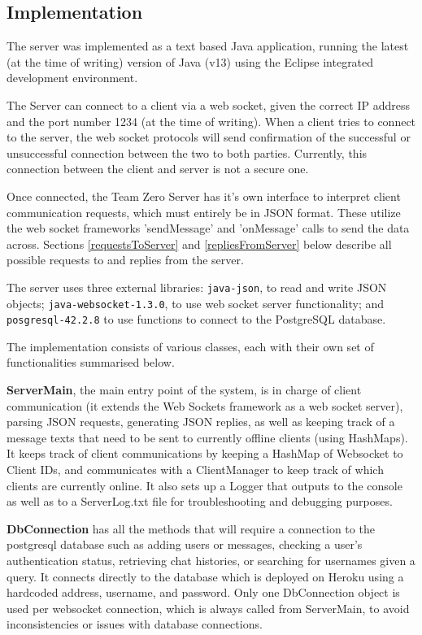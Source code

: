 \subsection{Implementation}

The server was implemented as a text based Java application, running the latest (at the time of writing) version of Java (v13) using the Eclipse integrated development environment.

The Server can connect to a client via a web socket, given the correct IP address and the port number 1234 (at the time of writing). When a client tries to connect to the server, the web socket protocols will send confirmation of the successful or unsuccessful connection between the two to both parties. Currently, this connection between the client and server is not a secure one. 

Once connected, the Team Zero Server has it's own interface to interpret client communication requests, which must entirely be in JSON format. These utilize the web socket frameworks 'sendMessage' and 'onMessage' calls to send the data across. Sections \ref{requestsToServer} and \ref{repliesFromServer} below describe all possible requests to and replies from the server.

The server uses three external libraries: \verb|java-json|, to read and write JSON objects; \verb|java-websocket-1.3.0|, to use web socket server functionality; and \verb|posgresql-42.2.8| to use functions to connect to the PostgreSQL database.

The implementation consists of various classes, each with their own set of functionalities summarised below.

\textbf{ServerMain}, the main entry point of the system, is in charge of client communication (it extends the Web Sockets framework as a web socket server), parsing JSON requests, generating JSON replies, as well as keeping track of  a message texts that need to be sent to currently offline clients (using HashMaps). It keeps track of client communications by keeping a HashMap of Websocket to Client IDs, and communicates with a ClientManager to keep track of which clients are currently online. It also sets up a Logger that outputs to the console as well as to a ServerLog.txt file for troubleshooting and debugging purposes. 

\textbf{DbConnection} has all the methods that will require a connection to the postgresql database such as adding users or messages, checking a user's authentication status, retrieving chat histories, or searching for usernames given a query. It connects directly to the database which is deployed on Heroku using a hardcoded address, username, and password. Only one DbConnection object is used per websocket connection, which is always called from ServerMain, to avoid inconsistencies or issues with database connections.


